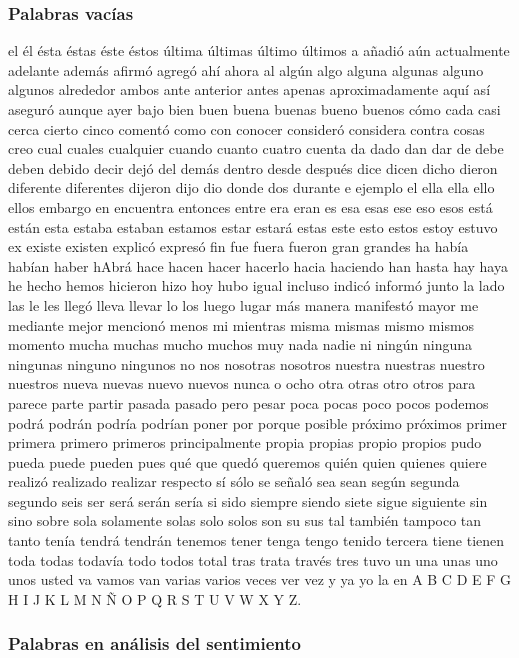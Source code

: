 \documentclass[../all.tex]{subfiles}
\begin{document}
\subsubsection{Palabras vacías}
    el él ésta éstas éste éstos última últimas último últimos  a añadió aún actualmente adelante además afirmó agregó ahí ahora al  algún algo alguna algunas alguno algunos alrededor ambos ante anterior antes  apenas aproximadamente aquí así aseguró aunque ayer bajo bien buen  buena buenas bueno buenos cómo cada casi cerca cierto cinco comentó como
    con conocer consideró considera contra cosas creo cual cuales cualquier cuando  cuanto cuatro cuenta da dado dan dar de debe deben debido decir dejó del  demás dentro desde después dice dicen dicho dieron diferente diferentes dijeron
    dijo dio donde dos durante e ejemplo el ella ella ello ellos embargo en  encuentra entonces entre era eran es  esa esas ese eso esos está están esta  estaba estaban estamos estar estará estas este esto estos estoy estuvo ex existe existen explicó expresó fin fue fuera fueron gran grandes ha había habían haber hAbrá hace hacen hacer hacerlo
    hacia haciendo han hasta hay haya he hecho hemos hicieron hizo hoy hubo igual incluso indicó informó
    junto la lado las le les llegó  lleva llevar lo los luego lugar  más manera manifestó mayor me mediante  mejor mencionó menos mi mientras misma  mismas mismo mismos momento mucha muchas  mucho muchos muy nada nadie ni ningún
    ninguna ningunas ninguno ningunos no nos  nosotras nosotros nuestra nuestras nuestro nuestros nueva nuevas nuevo nuevos nunca  o ocho otra otras otro otros para parece parte partir pasada pasado pero  pesar poca pocas poco pocos podemos
    podrá podrán podría podrían poner por  porque posible próximo próximos primer primera primero primeros principalmente propia  propias propio propios pudo pueda puede pueden pues qué que quedó  queremos quién quien quienes quiere
    realizó realizado realizar respecto sí  sólo se señaló sea sean según segunda segundo seis ser será serán sería si  sido siempre siendo siete sigue siguiente sin sino sobre sola solamente solas solo  solos son su sus tal también tampoco
    tan tanto tenía tendrá tendrán tenemos  tener tenga tengo tenido tercera tiene tienen toda todas todavía todo todos  total tras trata través tres tuvo un una unas uno unos usted va  vamos van varias varios veces ver vez y ya yo la en  A B C D E F G H I J K L M N Ñ O P Q R S T U V W X Y Z.

\newpage
\subsubsection{Palabras en análisis del sentimiento}
\end{document}
